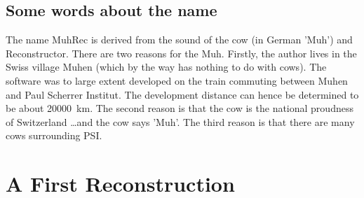 \documentclass[a4paper]{scrreprt}
\begin{document}
\section{Some words about the name}
The name MuhRec is derived from the sound of the cow (in German 'Muh') and Reconstructor. There are two reasons for the Muh. Firstly, the author lives in the Swiss village Muhen (which by the way has nothing to do with cows). The software was to large extent developed on the train commuting between Muhen and Paul Scherrer Institut. The development distance can hence be determined to be about 20000~km. The second reason is that the cow is the national proudness of Switzerland \ldots and the cow says 'Muh'. The third reason is that there are many cows surrounding PSI.

\chapter{A First Reconstruction}
\end{document}

